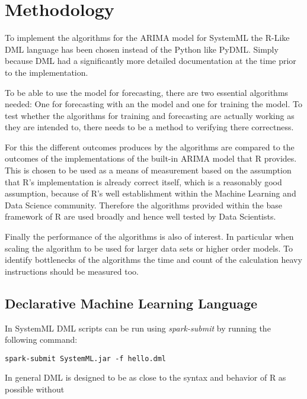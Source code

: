 \chapter{Methodology }
To implement the algorithms for  the \acs{ARIMA} model for SystemML the R-Like \acs{DML} language has been chosen instead of the Python like PyDML. Simply because \acs{DML} had a significantly more detailed documentation at the time prior to the implementation.

To be able to use the model for forecasting, there are two essential algorithms needed: One for forecasting with an the model and one for training the model. 
To test whether the algorithms for training and forecasting are actually working as they are intended to, there needs to be a method to verifying there correctness. 

For this the different outcomes produces by the algorithms are compared to the outcomes of the implementations of the built-in \acs{ARIMA} model that R provides. This is chosen to be used as a means of measurement based on the assumption that R's implementation is already correct itself, which is a reasonably good assumption, because of R's well establishment within the Machine Learning and Data Science community. Therefore the algorithms provided within the base framework of R are used broadly and hence well tested by Data Scientists.

Finally the performance of the algorithms is also of interest. In particular when scaling the algorithm to be used for larger data sets or higher order models. 
To identify bottlenecks of the algorithms the time and count of the calculation heavy instructions should be measured too.

\section{Declarative Machine Learning Language}

In SystemML \acs{DML} scripts can be run using \textit{spark-submit} by running the following command:

\begin{lstlisting}[caption={Command running the "hello.dml" script},captionpos=b]
	spark-submit SystemML.jar -f hello.dml
\end{lstlisting}

In general \acs{DML} is designed to be as close to the syntax and behavior of R as possible without

